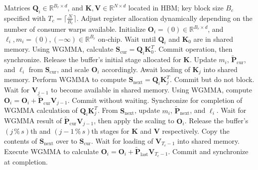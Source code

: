 \begin{algorithm}[H]
    \caption{\small\label{alg:flash3_wgmma}\textsc{FlashAttention-3} consumer warpgroup forward pass}
    \begin{algorithmic}[1]
      \REQUIRE Matrices $\mathbf{Q}_i \in \mathbb{R}^{B_r \times d}$, and $\mathbf{K}, \mathbf{V} \in \mathbb{R}^{N \times d}$ located in HBM; key block size $B_c$ specified with $T_c = \lceil \frac{N}{B_c} \rceil$.
      \STATE Adjust register allocation dynamically depending on the number of consumer warps available.
      \STATE Initialize $\mathbf{O}_i = (0) \in \mathbb{R}^{B_r \times d}$, and $\ell_i, m_i = (0), (-\infty) \in \mathbb{R}^{B_r}$ on-chip.
      \STATE Wait until $\mathbf{Q}_i$ and $\mathbf{K}_0$ are in shared memory.
      \STATE Using WGMMA, calculate $\mathbf{S}_{\mathrm{cur}} = \mathbf{Q}_i \mathbf{K}_0^T$. Commit operation, then synchronize.
      \STATE Release the buffer’s initial stage allocated for $\mathbf{K}$.
      \STATE Update $m_{i}$, $\tilde{\mathbf{P}}_{\mathrm{cur}}$, and $\ell_{i}$ from $\mathbf{S}_{\mathrm{cur}}$, and scale $\mathbf{O}_i$ accordingly.
        \STATE Await loading of $\mathbf{K}_j$ into shared memory.
        \label{code:mainloop_start}
        \STATE Perform WGMMA to compute $\mathbf{S}_{\mathrm{next}} = \mathbf{Q}_i \mathbf{K}_{j}^T$. Commit but do not block.
        \label{code:first_wgmma}
        \STATE Wait for $\mathbf{V}_{j-1}$ to become available in shared memory.
        \STATE Using WGMMA, compute $\mathbf{O}_{i} = \mathbf{O}_{i} + \tilde{\mathbf{P}}_{\mathrm{cur}} \mathbf{V}_{j-1}$. Commit without waiting. 
        \label{code:second_wgmma}
        \STATE Synchronize for completion of WGMMA calculation of $\mathbf{Q}_i \mathbf{K}_{j}^T$.
        \STATE From $\mathbf{S}_{\mathrm{next}}$, update $m_{i}$, $\tilde{\mathbf{P}}_{\mathrm{next}}$, and $\ell_{i}$.
        \label{code:softmax}
        \STATE Wait for WGMMA result of $\tilde{\mathbf{P}}_{\mathrm{cur}} \mathbf{V}_{j-1}$, then apply the scaling to $\mathbf{O}_i$.
        \STATE Release the buffer's $(j\,\%\,s)$th and $(j-1\,\%\,s)$th stages for $\mathbf{K}$ and $\mathbf{V}$ respectively.
        \STATE Copy the contents of $\mathbf{S}_{\mathrm{next}}$ over to $\mathbf{S}_{\mathrm{cur}}$.
        \label{code:mainloop_end}
      \ENDFOR 
      \STATE Wait for loading of $\mathbf{V}_{T_c - 1}$ into shared memory.
      \STATE Execute WGMMA to calculate $\mathbf{O}_{i} = \mathbf{O}_{i} + \tilde{\mathbf{P}}_{\mathrm{last}} \mathbf{V}_{T_c - 1}$. Commit and synchronize at completion.


\end{algorithmic}
\end{algorithm}
